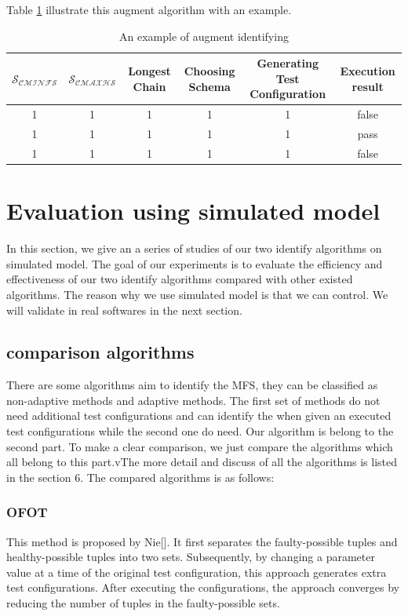\documentclass[10pt,journal,cspaper,compsoc]{IEEEtran}
\begin{document}
Table \ref{augment_example} illustrate this augment algorithm with an example.
\begin{table}\renewcommand{\arraystretch}{1.3}
  \caption{An example of augment identifying} \centering
  \label{augment_example}
  \begin{tabular}{c|c|c|c|c|c}\hline
  \hline
  \bfseries $\mathcal{S_{CMINFS}}$ &   \bfseries $\mathcal{S_{CMAXHS}}$ & \bfseries Longest Chain & \bfseries Choosing Schema & \bfseries Generating Test Configuration & \bfseries Execution result\\
  \hline
  1 & 1 & 1 & 1 & 1 & false \\
   1 & 1 & 1 & 1 & 1 & pass\\
  1 & 1 & 1 & 1 & 1 & false\\
  \hline
  \end{tabular}

\end{table}

\section{Evaluation using simulated model}
In this section, we give an a series of  studies of our two identify algorithms on simulated model. The goal of our experiments is to evaluate the efficiency and effectiveness of our two identify algorithms compared with other existed algorithms. The reason why we use simulated model is that we can control. We will validate in real softwares in the next section.
\subsection{comparison algorithms}
There are some algorithms aim to identify the MFS, they can be classified as non-adaptive methods and adaptive methods. The first set of methods do not need additional test configurations and can identify the when given an executed test configurations while the second one do need. Our algorithm is belong to the second part. To make a clear comparison, we just compare the algorithms which all belong to this part.vThe more detail and discuss of all the algorithms is listed in the section 6. The compared algorithms is as follows:
\subsubsection{OFOT}
This method is proposed by Nie[]. It first separates the faulty-possible tuples and healthy-possible tuples into two sets. Subsequently, by changing a parameter value at a time of the original test configuration, this approach generates extra test configurations. After executing the configurations, the approach converges by reducing the number of tuples in the faulty-possible sets.
\end{document}
